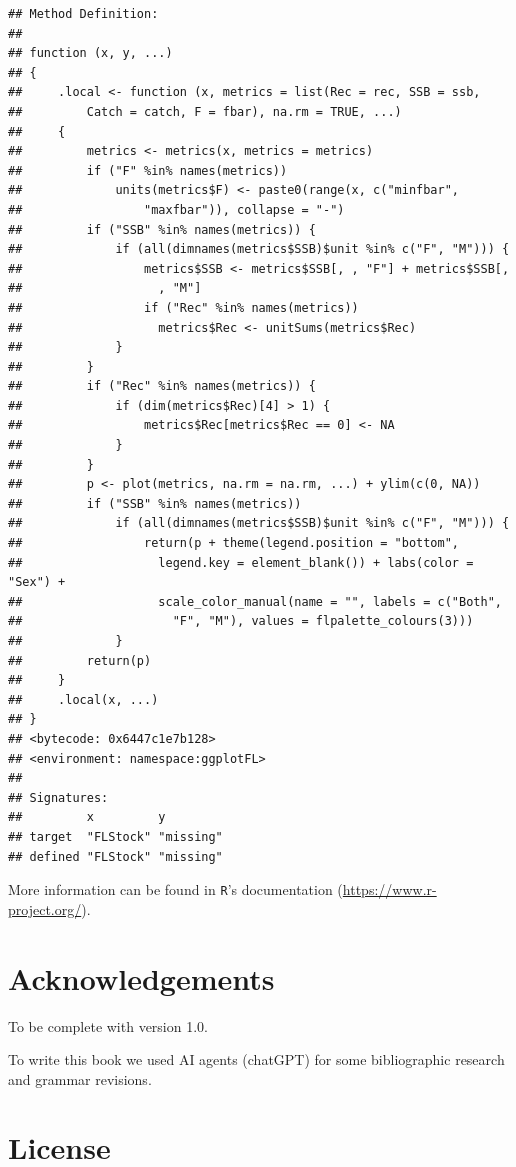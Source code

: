 \documentclass[
]{book}
\begin{document}
\begin{verbatim}
## Method Definition:
## 
## function (x, y, ...) 
## {
##     .local <- function (x, metrics = list(Rec = rec, SSB = ssb, 
##         Catch = catch, F = fbar), na.rm = TRUE, ...) 
##     {
##         metrics <- metrics(x, metrics = metrics)
##         if ("F" %in% names(metrics)) 
##             units(metrics$F) <- paste0(range(x, c("minfbar", 
##                 "maxfbar")), collapse = "-")
##         if ("SSB" %in% names(metrics)) {
##             if (all(dimnames(metrics$SSB)$unit %in% c("F", "M"))) {
##                 metrics$SSB <- metrics$SSB[, , "F"] + metrics$SSB[, 
##                   , "M"]
##                 if ("Rec" %in% names(metrics)) 
##                   metrics$Rec <- unitSums(metrics$Rec)
##             }
##         }
##         if ("Rec" %in% names(metrics)) {
##             if (dim(metrics$Rec)[4] > 1) {
##                 metrics$Rec[metrics$Rec == 0] <- NA
##             }
##         }
##         p <- plot(metrics, na.rm = na.rm, ...) + ylim(c(0, NA))
##         if ("SSB" %in% names(metrics)) 
##             if (all(dimnames(metrics$SSB)$unit %in% c("F", "M"))) {
##                 return(p + theme(legend.position = "bottom", 
##                   legend.key = element_blank()) + labs(color = "Sex") + 
##                   scale_color_manual(name = "", labels = c("Both", 
##                     "F", "M"), values = flpalette_colours(3)))
##             }
##         return(p)
##     }
##     .local(x, ...)
## }
## <bytecode: 0x6447c1e7b128>
## <environment: namespace:ggplotFL>
## 
## Signatures:
##         x         y        
## target  "FLStock" "missing"
## defined "FLStock" "missing"
\end{verbatim}

More information can be found in \texttt{R}'s documentation (\url{https://www.r-project.org/}).

\hypertarget{acknowledgements}{%
\section{Acknowledgements}\label{acknowledgements}}

To be complete with version 1.0.

To write this book we used AI agents (chatGPT) for some bibliographic research and grammar revisions.

\hypertarget{license}{%
\section{License}\label{license}}
\end{document}
